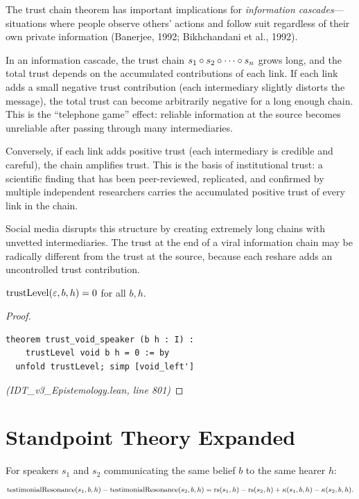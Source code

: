 \begin{remark}
The trust chain theorem has important implications for \emph{information cascades}---
situations where people observe others' actions and follow suit regardless of their
own private information (Banerjee, 1992; Bikhchandani et al., 1992).

In an information cascade, the trust chain $s_1 \circ s_2 \circ \cdots
\circ s_n$ grows long, and the total trust depends on the accumulated
contributions of each link. If each link adds a small negative trust contribution
(each intermediary slightly distorts the message), the total trust can become
arbitrarily negative for a long enough chain. This is the ``telephone game''
effect: reliable information at the source becomes unreliable after passing
through many intermediaries.

Conversely, if each link adds positive trust (each intermediary is credible and
careful), the chain amplifies trust. This is the basis of institutional trust:
a scientific finding that has been peer-reviewed, replicated, and confirmed by
multiple independent researchers carries the accumulated positive trust of
every link in the chain.

Social media disrupts this structure by creating extremely long chains with
unvetted intermediaries. The trust at the end of a viral information chain
may be radically different from the trust at the source, because each reshare
adds an uncontrolled trust contribution.
\end{remark}

\begin{theorem}
\label{thm:trust-void}
$\mathrm{trustLevel}(\varepsilon, b, h) = 0$ for all $b, h$.
\end{theorem}

\begin{proof}
\begin{lstlisting}
theorem trust_void_speaker (b h : I) :
    trustLevel void b h = 0 := by
  unfold trustLevel; simp [void_left']
\end{lstlisting}
\textit{(IDT\_v3\_Epistemology.lean, line 801)}
\end{proof}

\section{Standpoint Theory Expanded}

\begin{theorem}
\label{thm:standpoint-emergence}
For speakers $s_1$ and $s_2$ communicating the same belief $b$ to the same hearer $h$:
\[
  \mathrm{testimonialResonance}(s_1, b, h) - \mathrm{testimonialResonance}(s_2, b, h)
  = \mathrm{rs}(s_1, h) - \mathrm{rs}(s_2, h) + \kappa(s_1, b, h) - \kappa(s_2, b, h).
\]
\end{theorem}

